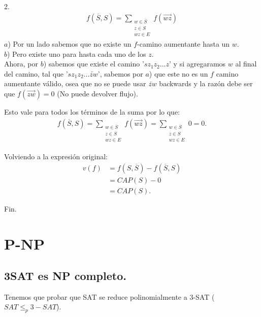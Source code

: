\documentclass{article}
\begin{document}
2.
\begin{equation}
	\begin{aligned}
		f(\overline{S},S) = 
		\sum_{
			\substack{w \in \overline{S}\\
			z \in S\\
			wz \in E
				}
		} f(\overrightarrow{wz})
	\end{aligned}
\end{equation}
$a$) Por un lado sabemos que no existe un $f$-camino aumentante hasta un $w$.\\
$b$) Pero existe uno para hasta cada uno de los $z$.\\

Ahora, por $b$) sabemos que existe el
camino '$sz_1z_2...z$' y si agregaramos $w$ al final del camino, tal que '$sz_1z_2...\overleftarrow{zw}$', sabemos por $a$) que este no es un  $f$ camino
aumentante válido, osea que no se puede usar $\overleftarrow{zw}$ backwards y la razón debe 
ser que $f(\overrightarrow{zw}) = 0$ (No puede devolver flujo).

Esto vale para todos los términos de la suma por lo que:
\begin{equation}
	\begin{aligned}
		f(\overline{S},S) = 
		\sum_{
			\substack{w \in \overline{S}\\
			z \in S\\
			wz \in E
				}
		} f(\overrightarrow{wz}) =
		\sum_{
			\substack{w \in \overline{S}\\
			z \in S\\
			wz \in E
				}
		} 0 = 0.
	\end{aligned}
\end{equation}

Volviendo a la expresión original:
\begin{equation}
	\begin{aligned}	
		v(f) &= f(S,\overline{S}) - f(\overline{S},S)\\
		     &= CAP(S) - 0\\
		     &= CAP(S).
	\end{aligned}
\end{equation}

Fin.

\section{P-NP}
\subsection{3SAT es NP completo.}
Tenemos que probar que SAT se reduce polinomialmente a 3-SAT ($SAT \leq_p 3-SAT$).
\end{document}

